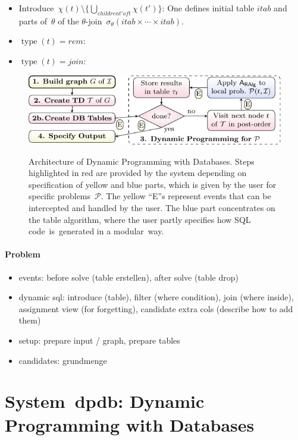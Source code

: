\documentclass{llncs}
\newcommand{\dpdb}{{\small\textsf{dpdb}}\xspace}
\DeclareMathOperator{\type}{type}
\newcommand{\rem}{\textit{rem}}
\newcommand{\join}{\textit{join}}
\begin{document}
\begin{itemize}
	\item Introduce~$\chi(t)\setminus\{\bigcup_{children t' of t}\chi(t')\}$: One defines initial table $itab$ and parts of~$\theta$ of the $\theta$-join~$\sigma_{\theta}(itab \times \cdots \times itab)$.
	\item $\type(t)=\rem$:
	\item $\type(t)=\join$:
\end{itemize}

%
%
\begin{figure}[t]%
\centering
  {\noindent\includegraphics[]{1-figs/figure.pdf}}
  \caption{Architecture of Dynamic Programming with Databases. Steps highlighted in red are provided by the system depending on specification of yellow and blue parts, which is given by the user for specific problems~$\mathcal{P}$. The yellow ``E''s represent events that can be intercepted and handled by the user. 
  The blue part concentrates on the table algorithm, where the user partly specifies how SQL code~is~generated in a modular~way.}
  \label{fig:arch}
%
\end{figure}

\paragraph*{Problem}

\begin{itemize}
	\item events: before solve (table erstellen), after solve (table drop)
	\item dynamic sql: introduce (table), filter (where condition), join (where inside), assignment view (for forgetting), candidate extra cols (describe how to add them)
	\item setup: prepare input / graph, prepare tables
	\item candidates: grundmenge

\end{itemize}

\section{System~\dpdb: Dynamic Programming with Databases}
\end{document}
